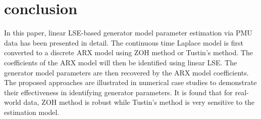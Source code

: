 \documentclass[10pt,journal,final]{IEEEtran}
\begin{document}
\section{conclusion}
\label{conclusion}
In this paper, linear LSE-based generator model parameter estimation via PMU data has been presented in detail. The continuous time Laplace model is first converted to a discrete ARX model using ZOH method or Tustin's method. The coefficients of the ARX model will then be identified using linear LSE. The generator model parameters are then recovered by the ARX model coefficients. The proposed approaches are illustrated in numerical case studies to demonstrate their effectiveness in identifying generator parameters. It is found that for real-world data, ZOH method is robust while Tustin's method is very sensitive to the estimation model.


\end{document}
